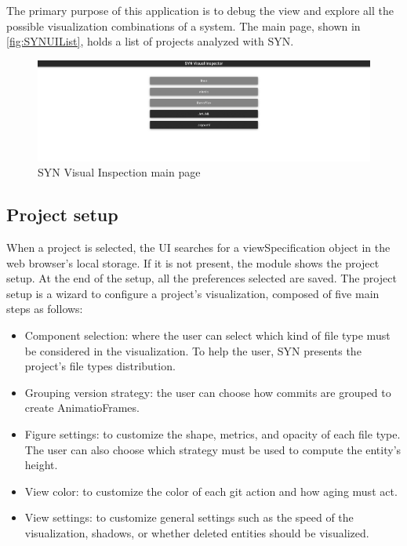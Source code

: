 The primary purpose of this application is to debug the view and explore all the possible visualization combinations of a system.
The main page, shown in \autoref{fig:SYNUIList}, holds a list of projects analyzed with SYN.

\begin{figure}
    \center
    \includegraphics[width=\textwidth]{SYNUI-List.png}
    \caption{SYN Visual Inspection main page}
    \label{fig:SYNUIList}
\end{figure}

\subsection*{Project setup}
When a project is selected, the UI searches for a viewSpecification object in the web browser's local storage. 
If it is not present, the module shows the project setup. At the end of the setup, all the preferences selected are saved. 
The project setup is a wizard to configure a project's visualization, composed of five main steps as follows:
\begin{itemize}
    \item Component selection: where the user can select which kind of file type must be considered in the visualization. To help the user, SYN presents the project's file types distribution.
    \item Grouping version strategy: the user can choose how commits are grouped to create AnimatioFrames.
    \item Figure settings: to customize the shape, metrics, and opacity of each file type. The user can also choose which strategy must be used to compute the entity's height. 
    \item View color: to customize the color of each git action and how aging must act. 
    \item View settings: to customize general settings such as the speed of the visualization, shadows, or whether deleted entities should be visualized. 
\end{itemize}

